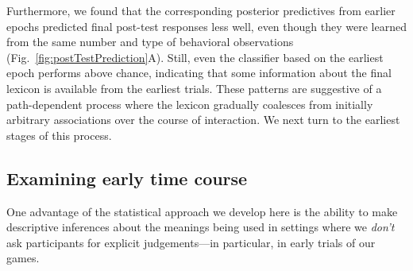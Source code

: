 Furthermore, we found that the corresponding posterior predictives from earlier epochs predicted final post-test responses less well, even though they were learned from the same number and type of behavioral observations (Fig.\ \ref{fig:postTestPrediction}A). Still, even the classifier based on the earliest epoch performs above chance, indicating that some information about the final lexicon is available from the earliest trials. These patterns are suggestive of a path-dependent process where the lexicon gradually coalesces from initially arbitrary associations over the course of interaction. We next turn to the earliest stages of this process.%

\subsection{Examining early time course}


One advantage of the statistical approach we develop here is the ability to make descriptive inferences about the meanings being used in settings where we \emph{don't} ask participants for explicit judgements---in particular, in early trials of our games. 


